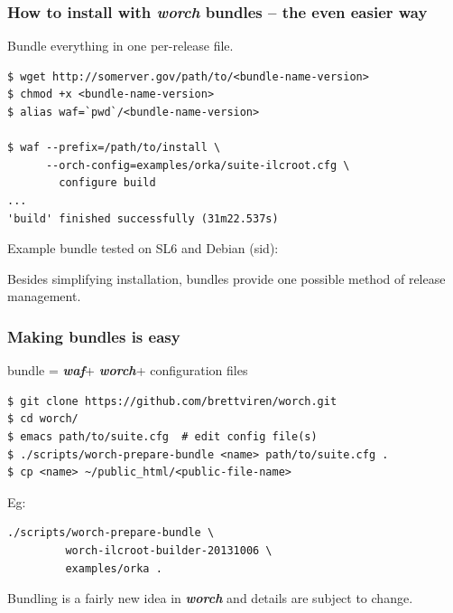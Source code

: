 \documentclass[xcolor=dvipsnames]{beamer}
\newcommand{\app}[1]{\textbf{\textit{#1}}\xspace}
\def\waf{\app{waf}}
\def\worch{\app{worch}}
\begin{document}
\begin{frame}[fragile]
  \frametitle{How to install with \worch{} bundles -- the even easier way}

  Bundle everything in one per-release file.

{\scriptsize
\begin{verbatim}
$ wget http://somerver.gov/path/to/<bundle-name-version>
$ chmod +x <bundle-name-version>
$ alias waf=`pwd`/<bundle-name-version>

$ waf --prefix=/path/to/install \
      --orch-config=examples/orka/suite-ilcroot.cfg \
        configure build
...
'build' finished successfully (31m22.537s)
\end{verbatim}
}

Example bundle tested on SL6 and Debian (sid):

Besides simplifying installation, bundles provide one possible method of release management.

\end{frame}

\begin{frame}[fragile]
  \frametitle{Making bundles is easy}

  \begin{center}
    bundle = \waf + \worch + configuration files    
  \end{center}

{
  \small
\begin{verbatim}
$ git clone https://github.com/brettviren/worch.git
$ cd worch/
$ emacs path/to/suite.cfg  # edit config file(s)
$ ./scripts/worch-prepare-bundle <name> path/to/suite.cfg .
$ cp <name> ~/public_html/<public-file-name>
\end{verbatim}
}

Eg:

\begin{verbatim}
./scripts/worch-prepare-bundle \
         worch-ilcroot-builder-20131006 \
         examples/orka .
\end{verbatim}

Bundling is a fairly new idea in \worch and details are subject to change.

\end{frame}
\end{document}
